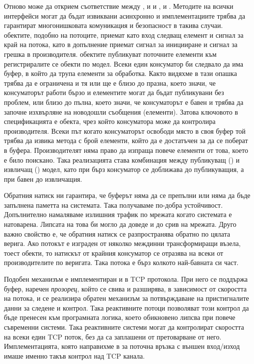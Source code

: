 Отново може да открием съответствие между ,  и  и ,  и . Методите на всички интерфейси могат да бъдат извиквани асинхронно и имплементациите трябва да гарантират многонишковата комуникация и безопасност в такива случаи.  обектите, подобно на  потоците, приемат като вход следващ елемент и сигнал за край на потока, като в допълнение приемат сигнал за иницииране и сигнал за грешка в производителя.  обектите публикуват поточните елементи към регистриралите се  обекти по  модел. Всеки един консуматор би следвало да има буфер, в който да трупа елементи за обработка. Както видяхме в  тази опашка трябва да е ограничена и тя или ще е близо до празна, което значи, че консуматорът работи бързо и елементите могат да бъдат публикувани без проблем, или близо до пълна, което значи, че консуматорът е бавен и трябва да започне изхвърляне на новодошли съобщения (елементи). Затова ключовото в спецификацията е  обекта, чрез който консуматора може да контролира производителя. Всеки път когато консуматорът освободи място в своя буфер той трябва да извика  метода с брой елементи, който да е достатъчен за да се поберат в буфера. Производителят няма право да изпраща повече елементи от това, което е било поискано. Така реализацията става комбинация между публикуващ () и извличащ () модел, като при бърз консуматор се доближава до публикуващия, а при бавен до извличащия.

Обратния натиск ни гарантира, че буферът няма да се препълни или няма да бъде запълнена паметта на системата. Така получаваме по-добра устойчивост. Допълнително намаляваме излишния трафик по мрежата когато системата е натоварена. Липсата на това би могло да доведе и до срив на мрежата. Друго важно свойство е, че обратния натиск се разпространява обратно по цялата верига. Ако потокът е изграден от няколко междинни трансформиращи възела, тоест  обекти, то натискът от крайния консуматор се отразява на всеки от производителите по веригата. Така потока е бърз колкото най-бавната си част.

Подобен механизъм е имплементиран и в TCP протокола. При него се поддържа буфер, наречен \emph{прозорец}, който се свива и разширява, в зависимост от скоростта на потока, и се реализира обратен механизъм за потвърждаване на пристигналите данни за следене и контрол. Така реактивните потоци позволяват този контрол да бъде пренесен към програмната логика, което обикновено липсва при повече съвременни системи. Така реактивните системи могат да контролират скоростта на всеки един TCP поток, без да са заплашени от претоварване от него. Имплементацията, която направихме в  за поточна връзка с външен вход/изход имаше именно такъв контрол над TCP канала.

